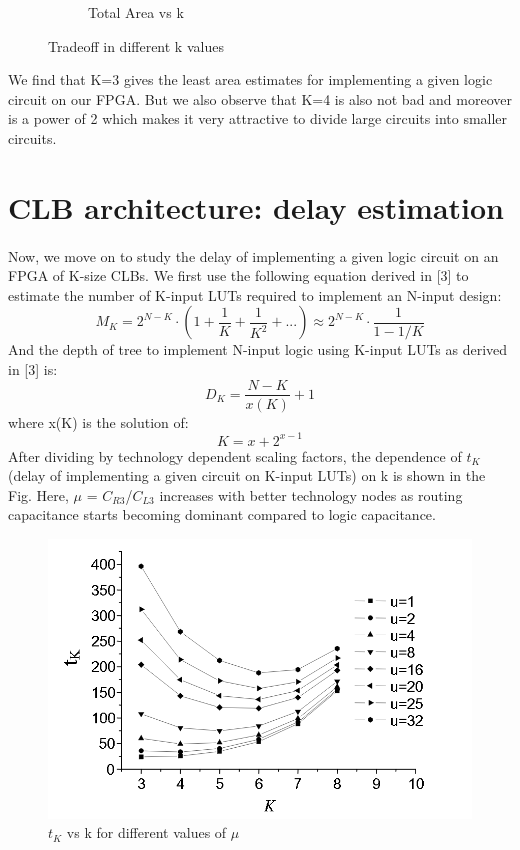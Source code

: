 \begin{figure}[h]
\begin{subfigure}{\textwidth}
\caption{Total Area vs k}
\label{fig:Figure}
\end{subfigure}
\caption{Tradeoff in different k values}
\label{fig:Figure}
\end{figure}

We find that K=3 gives the least area estimates for implementing a given logic circuit on our FPGA. But we also observe that K=4 is also not bad and moreover is a power of 2 which makes it very attractive to divide large circuits into smaller circuits.



\section{CLB architecture: delay estimation}
\paragraph{}
Now, we move on to study the delay of implementing a given logic circuit on an FPGA of K-size CLBs. We first use the following equation derived in [3] to estimate the number of K-input LUTs required to implement an N-input design:
\begin{equation}
M_K = 2^{N-K}\cdot( 1 + \frac{1}{K} + \frac{1}{K^2} + ...) \approx 2^{N-K}\cdot\frac{1}{1-1/K}  
\end{equation}
And the depth of tree to implement N-input logic using K-input LUTs as derived in [3] is:
\begin{equation}
D_K = \frac{N-K}{x(K)}+1  
\end{equation}
where x(K) is the solution of:
\begin{equation}
K = x + 2^{x-1}  
\end{equation}
After dividing by technology dependent scaling factors, the dependence of $t_K$ (delay of implementing a given circuit on K-input LUTs) on k is shown in the Fig. Here, $\mu$ = $C_{R3}$/$C_{L3}$ increases with better technology nodes as routing capacitance starts becoming dominant compared to logic capacitance.

\begin{figure}[H]
\centering
\includegraphics[width=\linewidth]{delay_vs_k.png}
\caption{$t_K$ vs k for different values of $\mu$}
\label{fig:Figure}
\end{figure}

